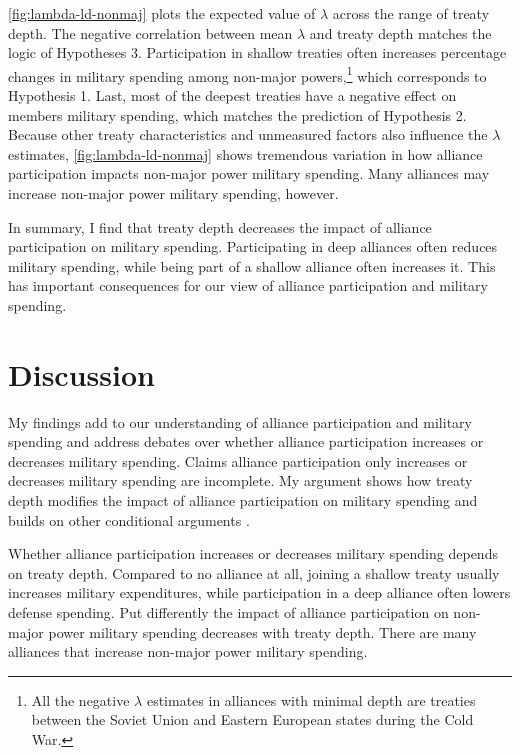\documentclass[12pt]{article}
\begin{document}
\autoref{fig:lambda-ld-nonmaj} plots the expected value of $\lambda$ across the range of treaty depth. 
The negative correlation between mean $\lambda$ and treaty depth matches the logic of Hypotheses 3. 
Participation in shallow treaties often increases percentage changes in military spending among non-major powers,\footnote{All the negative $\lambda$ estimates in alliances with minimal depth are treaties between the Soviet Union and Eastern European states during the Cold War.} which corresponds to Hypothesis 1. 
Last, most of the deepest treaties have a negative effect on members military spending, which matches the prediction of Hypothesis 2. 
Because other treaty characteristics and unmeasured factors also influence the $\lambda$ estimates, \autoref{fig:lambda-ld-nonmaj} shows tremendous variation in how alliance participation impacts non-major power military spending. 
Many alliances may increase non-major power military spending, however. 


In summary, I find that treaty depth decreases the impact of alliance participation on military spending. 
Participating in deep alliances often reduces military spending, while being part of a shallow alliance often increases it. 
This has important consequences for our view of alliance participation and military spending. 



\section{Discussion}


My findings add to our understanding of alliance participation and military spending and address debates over whether alliance participation increases or decreases military spending. 
Claims alliance participation only increases or decreases military spending are incomplete. 
My argument shows how treaty depth modifies the impact of alliance participation on military spending and builds on other conditional arguments \citep{DigiuseppePoast2016}. 


Whether alliance participation increases or decreases military spending depends on treaty depth. 
Compared to no alliance at all, joining a shallow treaty usually increases military expenditures, while participation in a deep alliance often lowers defense spending. 
Put differently the impact of alliance participation on non-major power military spending decreases with treaty depth.
There are many alliances that increase non-major power military spending. 
\end{document}
